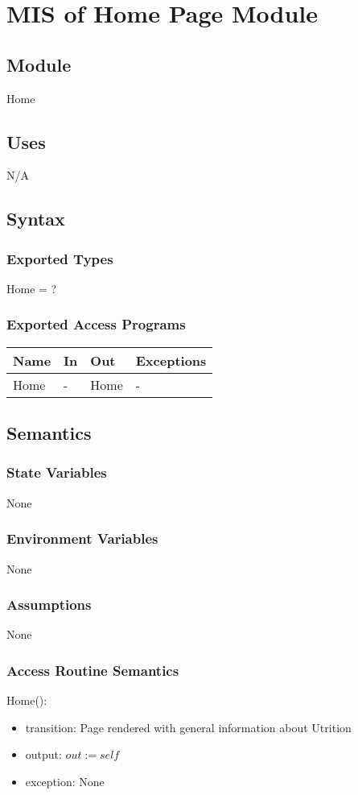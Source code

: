 \documentclass[12pt, titlepage]{article}
\begin{document}
\newpage

\section{MIS of Home Page Module} \label{HomePage}
\subsection{Module}
Home
\subsection{Uses}
N/A
\subsection{Syntax}
\subsubsection{Exported Types}
Home = ?
\subsubsection{Exported Access Programs}
\begin{center}
	\begin{tabular}{p{2cm} p{4cm} p{4cm} p{2cm}}
		\hline
		\textbf{Name} & \textbf{In} & \textbf{Out} & \textbf{Exceptions} \\
		\hline
		Home & - & Home & - \\
		\hline
	\end{tabular}
\end{center}
\subsection{Semantics}
\subsubsection{State Variables}
None
\subsubsection{Environment Variables}
None
\subsubsection{Assumptions}
None
\subsubsection{Access Routine Semantics}
\noindent Home():
\begin{itemize}
	\item transition: Page rendered with general information about Utrition
	\item output: $out := self$
	\item exception: None
\end{itemize}
\end{document}
